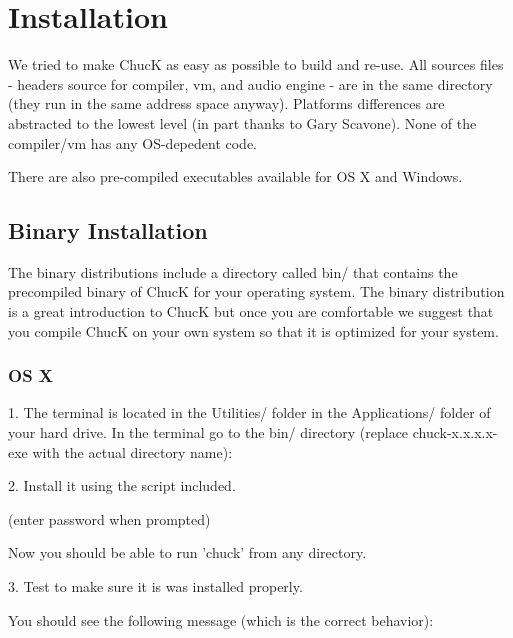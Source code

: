 \chapter{Installation}

We tried to make ChucK as easy as possible to build and re-use. All 
sources files - headers source for compiler, vm, and audio engine - are 
in the same directory (they run in the same address space anyway). Platforms 
differences are abstracted to the lowest level (in part thanks to Gary 
Scavone). None of the compiler/vm has any OS-depedent code.

There are also pre-compiled executables available for OS X and Windows.

\section{Binary Installation}

The binary distributions include a directory called bin/ that contains the precompiled binary of ChucK for your operating system. The binary distribution is a great introduction to ChucK but once you are comfortable we suggest that you compile ChucK on your own system so that it is optimized for your system. 

\subsection{OS X}
1. The terminal is located in the Utilities/ folder in the Applications/ folder of your hard drive. In the terminal go to the bin/ directory (replace chuck-x.x.x.x-exe with the actual directory name):


2. Install it using the script included.


(enter password when prompted)


Now you should be able to run 'chuck' from any directory.

3. Test to make sure it is was installed properly.


You should see the following message (which is the correct behavior):



